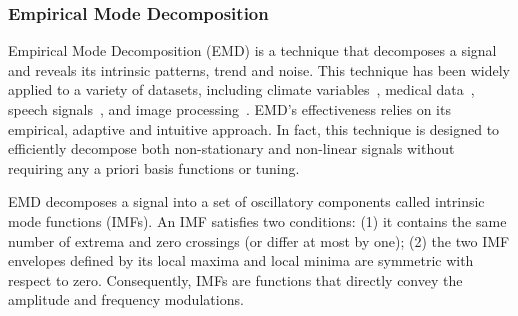 % 
% 


\subsubsection{Empirical Mode Decomposition} \label{emd}
Empirical Mode Decomposition (EMD) \cite{huang:emd1998} is a technique that decomposes a signal and reveals its intrinsic patterns, 
trend and noise.
This technique has been widely applied to a variety of datasets, including climate variables~\cite{lee:climateEMD2011}, medical data~\cite{blanco:bioMed2008}, speech signals~\cite{huang:signalProc2006,hasan:ieeeletter2009}, and image processing~\cite{nunes:vision2005}.
EMD's effectiveness relies on its empirical, adaptive and intuitive approach.
In fact, this technique is designed to efficiently decompose both non-stationary and non-linear signals without requiring any 
a priori basis functions or tuning.  

EMD decomposes a signal into a set of oscillatory components called intrinsic mode functions (IMFs). 
An IMF satisfies two conditions: (1) it contains the same number of extrema and zero crossings (or differ at most by one); (2) the two 
IMF envelopes defined by its local maxima and local minima are symmetric with respect to zero.  Consequently, 
 IMFs are functions that directly convey the amplitude and frequency modulations.

